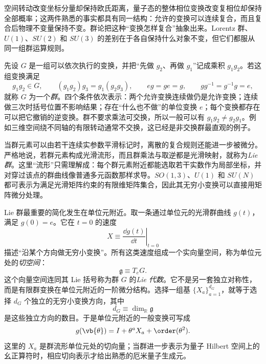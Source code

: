 空间转动改变坐标分量却保持欧氏距离，量子态的整体相位变换改变复相位却保持全部概率；这两件熟悉的事实都具有同一结构：允许的变换可以连续复合，而且复合后物理不变量保持不变。群论把这种“变换怎样复合”抽象出来。Lorentz 群、$U(1)$、$SU(2)$ 和 $SU(3)$ 的差别在于各自保持什么对象不变，但它们都服从同一组群运算规则。

先设 $G$ 是一组可以依次执行的变换，并把“先做 $g_2$、再做 $g_1$”记成乘积 $g_1g_2$。若这组变换满足
\begin{equation}
 g_1g_2\in G,\qquad
 (g_1g_2)g_3=g_1(g_2g_3),\qquad
 eg=ge=g,\qquad
 gg^{-1}=g^{-1}g=e,
 \label{eq:group-axioms-math-dp76}
\end{equation}
就称 $G$ 为一个\emph{群}。四个条件依次表示：两个允许变换连续做仍是允许变换；连续做三次时括号位置不影响结果；存在“什么也不做”的单位变换 $e$；每个变换都存在可以把它撤销的逆变换。群不要求乘法可交换，所以一般可以有 $g_1g_2\neq g_2g_1$。例如三维空间绕不同轴的有限转动通常不交换，这已经是非交换群最直观的例子。

当群元素可以由若干连续实参数平滑标记时，离散的复合规则还能进一步被微分。严格地说，若群元素构成光滑流形，而且群乘法与取逆都是光滑映射，就称为\emph{Lie 群}。这里“流形”只需理解成：每个群元素附近都能选取若干实数作为局部坐标，并对穿过该点的群曲线像普通多元函数那样求导。$SO(1,3)$、$U(1)$ 和 $SU(N)$ 都可表示为满足光滑矩阵约束的有限维矩阵集合，因此其无穷小变换可以直接用矩阵微分处理。

Lie 群最重要的简化发生在单位元附近。取一条通过单位元的光滑群曲线 $g(t)$，满足 $g(0)=e$。它在 $t=0$ 的速度
\begin{equation*}
 X\equiv\left.\frac{\dd g(t)}{\dd t}\right|_{t=0}
\end{equation*}
描述“沿某个方向做无穷小变换”。所有这类速度组成一个实向量空间，称为单位元处的\emph{切空间}：
\begin{equation}
 {\mathfrak g\equiv T_eG.}
 \label{eq:lie-algebra-tangent-general-dp68}
\end{equation}
这个向量空间连同其 Lie 括号称为群 $G$ 的\emph{Lie 代数}。它不是另一套独立对称性，而是有限群变换在单位元附近的一阶微分结构。选择一组基 $\{X_a\}_{a=1}^{d_G}$，就等于选择 $d_G$ 个独立的无穷小变换方向，其中
\begin{equation}
 d_G\equiv\dim_{\mathbb R}\mathfrak g
 \label{eq:lie-algebra-dimension-dp68}
\end{equation}
是这些独立方向的数目。于是单位元附近的一般变换可写成
\begin{equation}
 g(\vb{\theta})
 =I+\theta^aX_a+\order(\theta^2).
 \label{eq:lie-infinitesimal-dp11}
\end{equation}
这里的 $X_a$ 是群流形单位元处的切向量；当群进一步表示为量子 Hilbert 空间上的幺正算符时，相应切向表示才给出熟悉的厄米量子生成元。

